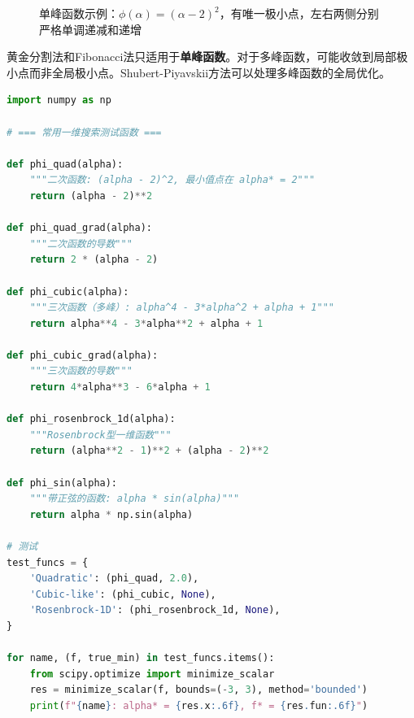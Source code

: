 \begin{figure}[H]
\centering
{}
\caption{单峰函数示例：$\phi(\alpha)=(\alpha-2)^2$，有唯一极小点，左右两侧分别严格单调递减和递增}
\label{fig:unimodal}
\end{figure}

\begin{notebox}[注意]
黄金分割法和Fibonacci法只适用于\textbf{单峰函数}。对于多峰函数，可能收敛到局部极小点而非全局极小点。Shubert-Piyavskii方法可以处理多峰函数的全局优化。
\end{notebox}

\begin{lstlisting}[language=Python, caption=测试函数定义]
import numpy as np

# === 常用一维搜索测试函数 ===

def phi_quad(alpha):
    """二次函数: (alpha - 2)^2, 最小值点在 alpha* = 2"""
    return (alpha - 2)**2

def phi_quad_grad(alpha):
    """二次函数的导数"""
    return 2 * (alpha - 2)

def phi_cubic(alpha):
    """三次函数（多峰）: alpha^4 - 3*alpha^2 + alpha + 1"""
    return alpha**4 - 3*alpha**2 + alpha + 1

def phi_cubic_grad(alpha):
    """三次函数的导数"""
    return 4*alpha**3 - 6*alpha + 1

def phi_rosenbrock_1d(alpha):
    """Rosenbrock型一维函数"""
    return (alpha**2 - 1)**2 + (alpha - 2)**2

def phi_sin(alpha):
    """带正弦的函数: alpha * sin(alpha)"""
    return alpha * np.sin(alpha)

# 测试
test_funcs = {
    'Quadratic': (phi_quad, 2.0),
    'Cubic-like': (phi_cubic, None),
    'Rosenbrock-1D': (phi_rosenbrock_1d, None),
}

for name, (f, true_min) in test_funcs.items():
    from scipy.optimize import minimize_scalar
    res = minimize_scalar(f, bounds=(-3, 3), method='bounded')
    print(f"{name}: alpha* = {res.x:.6f}, f* = {res.fun:.6f}")
\end{lstlisting}

